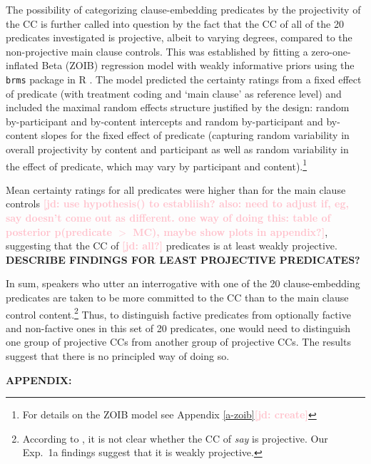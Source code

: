 \documentclass[11pt,fleqn]{article}
\newcommand{\jd}[1]{\textbf{\textcolor{Pink}{[jd: #1]}}}
\newcommand{\6}{\mbox{$[\hspace*{-.6mm}[$}}
\newcommand{\9}{\mbox{$]\hspace*{-.6mm}]$}}
\begin{document}
The possibility of categorizing clause-embedding predicates by the projectivity of the CC is further called into question by the fact that the CC of all of the 20 predicates investigated is projective, albeit to varying degrees, compared to the non-projective main clause controls. This was established by fitting a zero-one-inflated Beta (ZOIB) regression model \citep{liu2015} with weakly informative priors using the \verb|brms| \citep{buerkner2017}  package in R \citep{R}. The model predicted the certainty ratings from a fixed effect of predicate (with treatment coding and `main clause' as  reference level) and included the maximal random effects structure justified by the design: random by-participant and by-content intercepts and random by-participant and by-content slopes for the fixed effect of predicate (capturing random variability in overall projectivity by content and participant as well as random variability in the effect of predicate, which may vary by participant and content).\footnote{For details on the ZOIB model see Appendix \ref{a-zoib}\jd{create}} 

Mean certainty ratings for all predicates were higher than for the main clause controls \jd{use hypothesis() to establiish? also: need to adjust if, eg, say doesn't come out as different. one way of doing this: table of posterior p(predicate $>$ MC), maybe show plots in appendix?}, suggesting that the CC of \jd{all?} predicates is at least weakly projective.  {\bf DESCRIBE FINDINGS FOR LEAST PROJECTIVE PREDICATES?} 

In sum, speakers who utter an interrogative with one of the 20 clause-embedding predicates are taken to be more committed to the CC than to the main clause control content.\footnote{According to \citet[1739]{spector-egre2015}, it is not clear whether the CC of {\em say} is projective. Our Exp.~1a findings suggest that it is weakly projective.}    Thus, to distinguish factive predicates from optionally factive and non-factive ones in this set of 20 predicates, one would need to distinguish one group of projective CCs from another group of projective CCs. The results suggest that there is no principled way of doing so.


{\bf APPENDIX:} 
\end{document}
